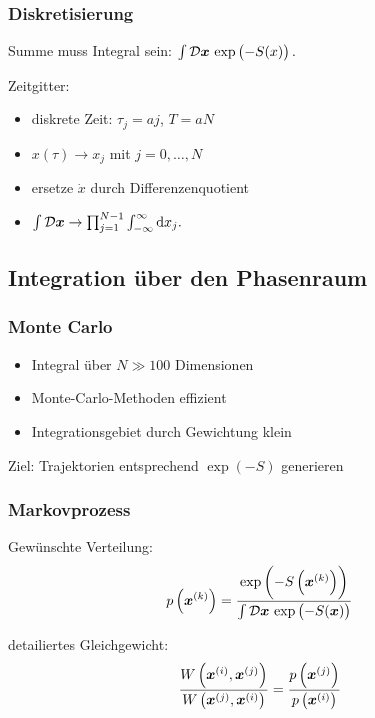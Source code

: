 \documentclass[ngerman, fleqn]{beamer}
\newcommand\timesites{N}
\newcommand\funcmeasure{\mathcal D \vec x}
\begin{document}
\begin{frame}
    \frametitle{Diskretisierung}

    Summe muss Integral sein:
    \(
        \int \funcmeasure \, \exp\del{-S(x)}.
    \)

    Zeitgitter:
    \begin{itemize}
        \item
            diskrete Zeit: $\tau_j = a j$, $T = aN$
        \item
            $x(\tau) \to x_j$ mit $j = 0, \ldots, N$
        \item
            ersetze $\dot x$ durch Differenzenquotient
        \item
            \(
            \int \funcmeasure
            \to
            \prod_{j = 1}^{\timesites-1} \int_{-\infty}^\infty \dif x_j.
            \)
    \end{itemize}

\end{frame}

\subsection{Integration über den Phasenraum}

\begin{frame}
    \frametitle{Monte Carlo}

    \begin{itemize}
        \item 
            Integral über $N \gg 100$ Dimensionen
        \item
            Monte-Carlo-Methoden effizient
        \item
            Integrationsgebiet durch Gewichtung klein
    \end{itemize}

    Ziel: Trajektorien entsprechend $\exp(-S)$ generieren
\end{frame}

\begin{frame}
    \frametitle{Markovprozess}

    Gewünschte Verteilung:
    \[
        p\del{\vec x^{(k)}} = \frac{\exp\del{-S\del{\vec x^{(k)}}}}{\int
            \funcmeasure
        \, \exp\del{-S(\vec x)}}
    \]

    detailiertes Gleichgewicht:
    \[
        \frac{W\del{\vec x^{(i)}, \vec x^{(j)}}}{W\del{\vec x^{(j)}, \vec x^{(i)}}}
        = \frac{p\del{\vec x^{(j)}}}{p\del{\vec x^{(i)}}}
    \]
\end{frame}
\end{document}
